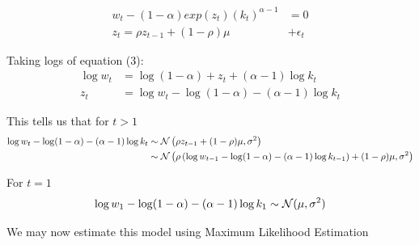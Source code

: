 \documentclass[12pt, letterpaper]{paper}
\begin{document}
\begin{align*}
  w_t - (1-\alpha) exp( z_t ) (k_t)^{\alpha-1} &= 0\\
  z_t = \rho z_{t-1} + (1-\rho)\mu &+ \epsilon_t
\end{align*}

Taking logs of equation (3):
\begin{align*}
  \log w_t &= \log ( 1- \alpha) + z_t + (\alpha-1) \log k_t\\
  z_t &= \log w_t - \log ( 1- \alpha) - (\alpha-1) \log k_t
\end{align*}

This tells us that for $t > 1$
\begin{align*}
  \log w_t - \log ( 1- \alpha) - (\alpha-1) \log k_t &\sim \mathcal{N}\left( \rho z_{t-1} +
                                             (1-\rho)\mu, \sigma^2 \right)\\
  &\sim \mathcal{N}\left( \rho\left( \log w_{t-1} - \log( 1- \alpha) -(\alpha-1) \log
    k_{t-1} \right) + (1-\rho)\mu, \sigma^2 \right)
\end{align*}

For $t=1$
\begin{equation*}
  \log w_1 - \log ( 1- \alpha) - (\alpha-1) \log k_1 \sim \mathcal{N}( \mu, \sigma^2)
\end{equation*}


We may now estimate this model using Maximum Likelihood Estimation
\end{document}
